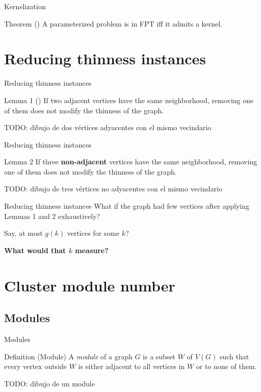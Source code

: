 \documentclass{beamer}
\begin{document}
\begin{frame}{Kernelization}
    \begin{block}{Theorem (\cite{parameterized-algorithms})}
        A parameterized problem is in FPT iff it admits a kernel.
    \end{block}
\end{frame}

\section{Reducing thinness instances}
\begin{frame}{Reducing thinness instances}
    \begin{block}{Lemma 1 (\cite{thinness-of-product-graphs})}
        If two adjacent vertices have the same neighborhood, removing one of them does not modify the thinness of the graph.
    \end{block}

    TODO: dibujo de dos vértices adyacentes con el mismo vecindario
\end{frame}

\begin{frame}{Reducing thinness instances}
    \begin{block}{Lemma 2}
        If three \textbf{non-adjacent} vertices have the same neighborhood, removing one of them does not modify the thinness of the graph.
    \end{block}

    TODO: dibujo de tres vértices no adyacentes con el mismo vecindario
\end{frame}

\begin{frame}{Reducing thinness instances}
    What if the graph had few vertices after applying Lemmas 1 and 2 exhaustively? 

    \vspace{1em}
    \pause
    Say, at most $g(k)$ vertices for some $k$?

    \vspace{1em}
    \pause
    \textbf{What would that $k$ measure?}
\end{frame}

\section{Cluster module number}
\subsection{Modules}
\begin{frame}{Modules}
    \begin{block}{Definition (Module)}
        A \emph{module} of a graph $G$ is a subset $W$ of $V(G)$ such that every vertex outside $W$ is either adjacent to all vertices in $W$ or to none of them.
    \end{block}

    TODO: dibujo de un module
\end{frame}
\end{document}
